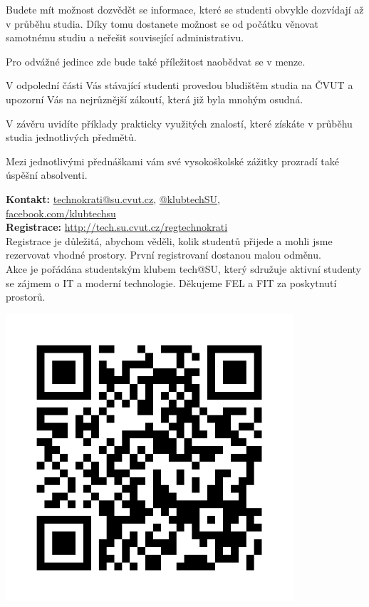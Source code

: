 \documentclass[12pt]{extarticle}[10.3.2013]
\makeatletter
\newcommand{\B}[1]{\textbf{{#1}}}
\newcommand{\techSU}{tech@SU}
\makeatother
\begin{document}
Budete mít možnost dozvědět se informace, které se studenti obvykle
dozvídají až v průběhu studia. Díky tomu dostanete možnost se od
počátku věnovat samotnému studiu a neřešit související administrativu.


Pro odvážné jedince zde bude také příležitost naobědvat se v menze.

V odpolední části Vás stávající studenti provedou bludištěm studia na
ČVUT a upozorní Vás na nejrůznější zákoutí, která již byla mnohým osudná.

V závěru uvidíte příklady prakticky využitých znalostí, které získáte v
průběhu studia jednotlivých předmětů.

Mezi jednotlivými přednáškami vám své vysokoškolské zážitky prozradí
také úspěšní absolventi.

\vspace{3em}

\begin{minipage}[c]{0.5\textwidth}
\B{Kontakt:} \href{mailto:technokrati@su.cvut.cz}{technokrati@su.cvut.cz}, \href{https://twitter.com/klubtechsu}{@klubtechSU}, \\ \href{https://facebook.com/klubtechsu}{facebook.com/klubtechsu} \\

\B{Registrace:} \href{http://tech.su.cvut.cz/regtechnokrati}{http://tech.su.cvut.cz/regtechnokrati} \\
Registrace je důležitá, abychom věděli, kolik studentů přijede a mohli jsme rezervovat vhodné prostory. První registrovaní dostanou malou odměnu. \\

Akce je pořádána studentským klubem \techSU, který sdružuje aktivní studenty se zájmem o IT a moderní technologie. Děkujeme FEL a FIT za poskytnutí prostorů.
\end{minipage}
\begin{minipage}[c]{0.5\textwidth}
\begin{center}
	{\includegraphics[width=0.8\textwidth]{reg-odkaz.png}}
\end{center}
\end{minipage}
\end{document}
